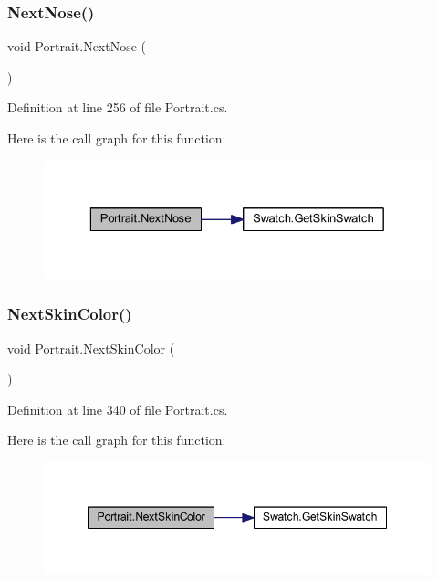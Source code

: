\subsubsection{\texorpdfstring{NextNose()}{NextNose()}}
{\footnotesize\ttfamily void Portrait.\+Next\+Nose (\begin{DoxyParamCaption}{ }\end{DoxyParamCaption})}



Definition at line 256 of file Portrait.\+cs.

Here is the call graph for this function\+:
\nopagebreak
\begin{figure}[H]
\begin{center}
\leavevmode
\includegraphics[width=329pt]{class_portrait_a7fc2c7d9f078303182503c717c05b9d5_cgraph}
\end{center}
\end{figure}
\mbox{\label{class_portrait_a601ece8887c692a5a9f6d910fd3a2cec}} 
\subsubsection{\texorpdfstring{NextSkinColor()}{NextSkinColor()}}
{\footnotesize\ttfamily void Portrait.\+Next\+Skin\+Color (\begin{DoxyParamCaption}{ }\end{DoxyParamCaption})}



Definition at line 340 of file Portrait.\+cs.

Here is the call graph for this function\+:
\nopagebreak
\begin{figure}[H]
\begin{center}
\leavevmode
\includegraphics[width=348pt]{class_portrait_a601ece8887c692a5a9f6d910fd3a2cec_cgraph}
\end{center}
\end{figure}
\mbox{\label{class_portrait_ada91686eb3d44e5771a81dc147462258}} 
